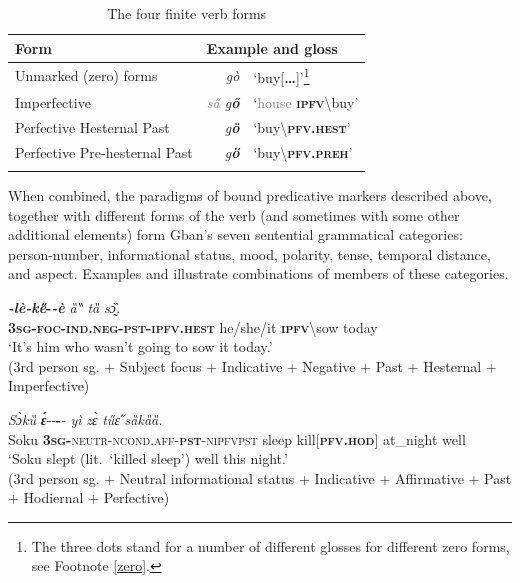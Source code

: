 \documentclass[output=paper,colorlinks,citecolor=brown
]{langscibook}
\begin{document}
\begin{table}[t]
\begin{tabularx}{\textwidth}{Xrl}
\lsptoprule
Form & \multicolumn{2}{l}{Example and gloss} \\ \midrule
Unmarked (zero) forms & \textit{gò} & `buy[\textbf{\dots}]'\footnote{The three dots stand for a number of different glosses for different zero forms, see Footnote \ref{zero}.} \\
Imperfective & \textit{\textcolor{gray}{sa̋} g\textbf{ő}} & `\textcolor{gray}{house} \textsc{\textbf{ipfv}}\backslash buy' \\
Perfective Hesternal Past & \textit{g\textbf{ȍ}} & `buy\backslash\textsc{\textbf{pfv.hest}}' \\
Perfective Pre-hesternal Past & \textit{g\textbf{ö}} & `buy\backslash\textsc{\textbf{pfv.preh}}' \\ 
\lspbottomrule
\end{tabularx}
\caption{The four finite verb forms}
\label{tab5}
\end{table}


When combined, the paradigms of bound predicative markers described above, together with different forms of the verb (and sometimes with some other additional elements) form Gban's seven sentential grammatical categories: person-number, informational status, mood, polarity, tense, temporal distance, and aspect. 
Examples  and  illustrate combinations of members of these categories.



\ea \label{ex:Fed6}%
\gll \textit{\textbf{{\E}-lè-ke̋}}\textbf{\upshape-\textupstep}\textit{\textbf{-è}} \textit{ȁ‶} \textit{tȁ} \textit{sɔ̰̏.} \\
\textsc{\textbf{3sg-foc-ind.neg-pst-ipfv.hest}} he/she/it \textsc{\textbf{ipfv}}\backslash sow today \\
\glt `It's him who wasn't going to sow it today.' \\
(3rd person sg. + Subject focus + Indicative + Negative + Past + Hesternal + Imperfective)


\ex \label{ex:Fed7}
\gll \textit{Sɔ̀kȕ} {\textbf{\textit{\'ɛ}}‑\FedotovBoldEmpty{}‑\FedotovBoldEmpty{}\textbf{\upshape-\textupstep}‑\FedotovBoldEmpty{}\textup{\footnotemark}} \textit{yì} \textit{zɛ̀} \textit{tűɛ̋} \textit{sȁkȁȁ.}\\
Soku \textsc{\textbf{3sg-}neutr-ncond.aff-\textbf{pst}-nipfvpst} sleep kill\textsc{[\textbf{pfv.hod}]} at\_night well\\
\glt `Soku slept (lit.\ `killed sleep') well this night.' \\
(3rd person sg. + Neutral informational status + Indicative + Affirmative + Past + Hodiernal + Perfective)
\z
\end{document}
